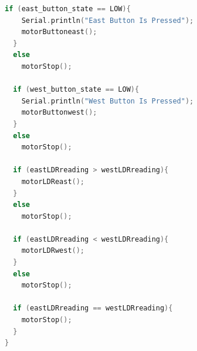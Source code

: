 \begin{lstlisting}[language=C++]
  if (east_button_state == LOW){ 
    Serial.println("East Button Is Pressed"); 
    motorButtoneast(); 
  } 
  else 
    motorStop(); 

  if (west_button_state == LOW){ 
    Serial.println("West Button Is Pressed"); 
    motorButtonwest(); 
  } 
  else 
    motorStop(); 

  if (eastLDRreading > westLDRreading){ 
    motorLDReast(); 
  } 
  else 
    motorStop(); 

  if (eastLDRreading < westLDRreading){ 
    motorLDRwest(); 
  } 
  else 
    motorStop(); 

  if (eastLDRreading == westLDRreading){ 
    motorStop(); 
  } 
}
\end{lstlisting}
\clearpage
